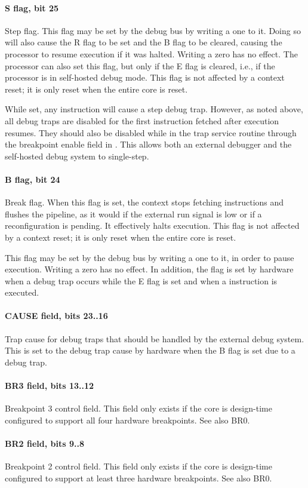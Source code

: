 \paragraph*{S flag, bit 25}
Step flag. This flag may be set by the debug bus by writing a one to it. Doing
so will also cause the R flag to be set and the B flag to be cleared, causing
the processor to resume execution if it was halted. Writing a zero has no
effect. The processor can also set this flag, but only if the E flag is cleared,
i.e., if the processor is in self-hosted debug mode. This flag is not affected
by a context reset; it is only reset when the entire core is reset.

While set, any instruction will cause a step debug trap. However, as noted
above, all debug traps are disabled for the first instruction fetched after
execution resumes. They should also be disabled while in the trap service
routine through the breakpoint enable field in . This allows both an
external debugger and the self-hosted debug system to single-step.
\paragraph*{B flag, bit 24}
Break flag. When this flag is set, the context stops fetching instructions and
flushes the pipeline, as it would if the external run signal is low or if a
reconfiguration is pending. It effectively halts execution. This flag is not
affected by a context reset; it is only reset when the entire core is reset.

This flag may be set by the debug bus by writing a one to it, in order to pause
execution. Writing a zero has no effect. In addition, the flag is set by
hardware when a debug trap occurs while the E flag is set and when a 
instruction is executed.
\paragraph*{CAUSE field, bits 23..16}
Trap cause for debug traps that should be handled by the external debug system.
This is set to the debug trap cause by hardware when the B flag is set due to a
debug trap.
\paragraph*{BR3 field, bits 13..12}
Breakpoint 3 control field. This field only exists if the core is design-time
configured to support all four hardware breakpoints. See also BR0.
\paragraph*{BR2 field, bits 9..8}
Breakpoint 2 control field. This field only exists if the core is design-time
configured to support at least three hardware breakpoints. See also BR0.
